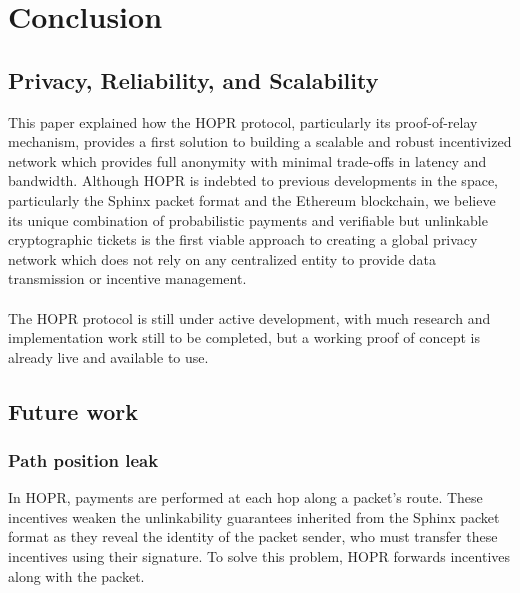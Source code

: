 \section{Conclusion}

\subsection{Privacy, Reliability, and Scalability}

This paper explained how the HOPR protocol, particularly its proof-of-relay mechanism, provides a first solution to building a scalable and robust incentivized network which provides full anonymity with minimal trade-offs in latency and bandwidth. Although HOPR is indebted to previous developments in the space, particularly the Sphinx packet format and the Ethereum blockchain, we believe its unique combination of probabilistic payments and verifiable but unlinkable cryptographic tickets is the first viable approach to creating a global privacy network which does not rely on any centralized entity to provide data transmission or incentive management.
\\~\\The HOPR protocol is still under active development, with much research and implementation work still to be completed, but a working proof of concept is already live and available to use. 

\subsection{Future work}

\subsubsection{Path position leak}

In HOPR, payments are performed at each hop along a packet’s route. These
incentives weaken the unlinkability guarantees inherited from the Sphinx packet
format \cite{sphinxpaper} as they reveal the identity of the packet sender, who
must transfer these incentives using their signature. To solve this
problem, HOPR forwards incentives along with the packet.

